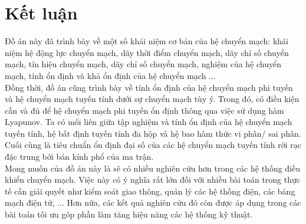 \documentclass[14pt,a4paper,oneside]{report}		%
\theoremstyle{definition}
\begin{document}
\chapter*{Kết luận}
Đồ án này đã trình bày về một số khái niệm cơ bản của hệ chuyển mạch: khái niệm hệ động lực chuyển mạch, dãy thời điểm chuyển mạch, dãy chỉ số chuyển mạch, tín hiệu chuyển mạch, dãy chỉ số chuyển mạch, nghiệm của hệ chuyển mạch, tính ổn định và khả ổn định của hệ chuyển mạch ...\\
Đồng thời, đồ án cũng trình bày về tính ổn định của hệ chuyển mạch phi tuyến và hệ chuyển mạch tuyến tính dưới sự chuyển mạch tùy ý. Trong đó, có điều kiện cần và đủ để hệ chuyển mạch phi tuyến ổn định thông qua việc sử dụng hàm Lyapunov. Ta có mối liên giữa tập nghiệm và tính ổn định của hệ chuyển mạch tuyến tính, hệ bất định tuyến tính đa hộp và hệ bao hàm thức vi phân/ sai phân.\\
Cuối cùng là tiêu chuẩn ổn định đại số của các hệ chuyển mạch tuyến tính rời rạc đặc trung bởi bán kính phổ của ma trận.\\

Mong muốn của đồ án này là sẽ có nhiều nghiên cứu hơn trong các hệ thống điều khiển chuyển mạch. Việc này có ý nghĩa rất lớn đối với nhiều bài toán trong thực tế cần giải quyết như kiểm soát giao thông, quản lý các hệ thống điện, các bảng mạch điện tử, ... Hơn nữa, các kết quả nghiên cứu đó còn được áp dụng trong các bài toán tối ưu góp phần làm tăng hiệu năng các hệ thống kỹ thuật.




\vfill
\end{document}
